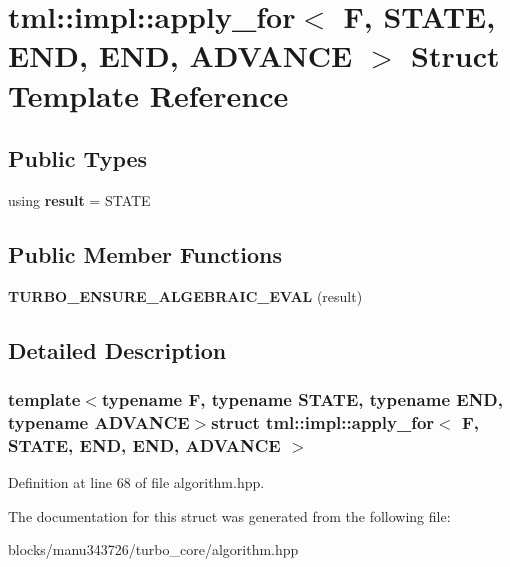 \hypertarget{structtml_1_1impl_1_1apply__for_3_01_f_00_01_s_t_a_t_e_00_01_e_n_d_00_01_e_n_d_00_01_a_d_v_a_n_c_e_01_4}{\section{tml\+:\+:impl\+:\+:apply\+\_\+for$<$ F, S\+T\+A\+T\+E, E\+N\+D, E\+N\+D, A\+D\+V\+A\+N\+C\+E $>$ Struct Template Reference}
\label{structtml_1_1impl_1_1apply__for_3_01_f_00_01_s_t_a_t_e_00_01_e_n_d_00_01_e_n_d_00_01_a_d_v_a_n_c_e_01_4}
}
\subsection*{Public Types}
\begin{DoxyCompactItemize}
\item 
\hypertarget{structtml_1_1impl_1_1apply__for_3_01_f_00_01_s_t_a_t_e_00_01_e_n_d_00_01_e_n_d_00_01_a_d_v_a_n_c_e_01_4_ad0cb095a5a5357d2c5f35b4f50fe7285}{using {\bfseries result} = S\+T\+A\+T\+E}\label{structtml_1_1impl_1_1apply__for_3_01_f_00_01_s_t_a_t_e_00_01_e_n_d_00_01_e_n_d_00_01_a_d_v_a_n_c_e_01_4_ad0cb095a5a5357d2c5f35b4f50fe7285}

\end{DoxyCompactItemize}
\subsection*{Public Member Functions}
\begin{DoxyCompactItemize}
\item 
\hypertarget{structtml_1_1impl_1_1apply__for_3_01_f_00_01_s_t_a_t_e_00_01_e_n_d_00_01_e_n_d_00_01_a_d_v_a_n_c_e_01_4_a545eccc61012f6b855d522f3566f1d3c}{{\bfseries T\+U\+R\+B\+O\+\_\+\+E\+N\+S\+U\+R\+E\+\_\+\+A\+L\+G\+E\+B\+R\+A\+I\+C\+\_\+\+E\+V\+A\+L} (result)}\label{structtml_1_1impl_1_1apply__for_3_01_f_00_01_s_t_a_t_e_00_01_e_n_d_00_01_e_n_d_00_01_a_d_v_a_n_c_e_01_4_a545eccc61012f6b855d522f3566f1d3c}

\end{DoxyCompactItemize}


\subsection{Detailed Description}
\subsubsection*{template$<$typename F, typename S\+T\+A\+T\+E, typename E\+N\+D, typename A\+D\+V\+A\+N\+C\+E$>$struct tml\+::impl\+::apply\+\_\+for$<$ F, S\+T\+A\+T\+E, E\+N\+D, E\+N\+D, A\+D\+V\+A\+N\+C\+E $>$}



Definition at line 68 of file algorithm.\+hpp.



The documentation for this struct was generated from the following file\+:\begin{DoxyCompactItemize}
\item 
blocks/manu343726/turbo\+\_\+core/algorithm.\+hpp\end{DoxyCompactItemize}
